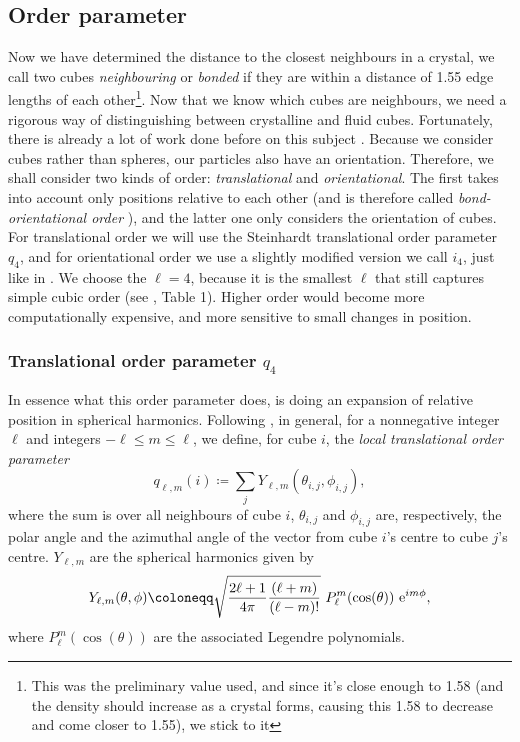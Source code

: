 \documentclass[thesis]{subfiles}
\begin{document}
\subsection{Order parameter}
Now we have determined the distance to the closest neighbours in a crystal, we call two cubes \emph{neighbouring} or \emph{bonded} if they are within a distance of 1.55 edge lengths of each other\footnote{This was the preliminary value used, and since it's close enough to 1.58 (and the density should increase as a crystal forms, causing this 1.58 to decrease and come closer to 1.55), we stick to it}. Now that we know which cubes are neighbours, we need a rigorous way of distinguishing between crystalline and fluid cubes. Fortunately, there is already a lot of work done before on this subject \cite{steinhardt1983bond, lechner2008accurate, van2017phase, sharma2018disorder, mickel2013shortcomings}. Because we consider cubes rather than spheres, our particles also have an orientation. Therefore, we shall consider two kinds of order: \emph{translational} and \emph{orientational}. The first takes into account only positions relative to each other (and is therefore called \emph{bond-orientational order} \cite{steinhardt1983bond}), and the latter one only considers the orientation of cubes. For translational order we will use the Steinhardt translational order parameter \cite{steinhardt1983bond} $q_4$, and for orientational order we use a slightly modified version we call $i_4$, just like in \cite{sharma2018disorder}. We choose the $\ell = 4$, because it is the smallest $\ell$ that still captures simple cubic order (see \cite{mickel2013shortcomings}, Table 1). Higher order would become more computationally expensive, and more sensitive to small changes in position.

\subsubsection{Translational order parameter \texorpdfstring{$q_4$}{q4}}
In essence what this order parameter does, is doing an expansion of relative position in spherical harmonics. Following \cite{sharma2018disorder}, in general, for a nonnegative integer $\ell$ and integers $ -\ell \leq m \leq\ell$, we define, for cube $i$, the \emph{local translational order parameter}
\begin{equation}
	q_{\ell, m}(i) \coloneqq \sum_{j} Y_{\ell, m} (\theta_{i, j}, \phi_{i, j}),
\end{equation}
where the sum is over all neighbours of cube $i$, $\theta_{i, j}$ and $\phi_{i, j}$ are, respectively, the polar angle and the azimuthal angle of the vector from cube $i$'s centre to cube $j$'s centre. $Y_{\ell, m}$ are the spherical harmonics given by
\begin{equation}
	Y_{\ell, m}(\theta, \phi) \coloneqq \sqrt{\frac{2\ell + 1}{4\pi}\frac{(\ell + m)}{(\ell - m)!}}\ P_\ell^m(\cos(\theta)) \ \me^{im\phi},
\end{equation}
where $P_\ell^m(\cos(\theta))$ are the associated Legendre polynomials. 
\end{document}
